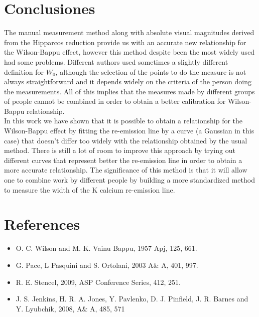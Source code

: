 \documentclass[twocolumn]{AS4201}
\begin{document}
\section{Conclusiones}
The manual measurement method along with absolute visual magnitudes derived from the Hipparcos reduction provide us with an accurate new relationship for the Wilson-Bappu effect, however this method despite been the most widely used had some problems. Different authors used sometimes a slightly different definition for $W_0$, although the selection of the points to do the measure is not always straightforward and it depends widely on the criteria of the person doing the measurements. All of this implies that the measures made by different groups of people cannot be combined in order to obtain a better calibration for Wilson-Bappu relationship.\\
In this work we have shown that it is possible to obtain a relationship for the Wilson-Bappu effect by fitting the re-emission line by a curve (a Gaussian in this case) that doesn't differ too widely with the relationship obtained by the usual method. There is still a lot of room to improve this approach by trying out different curves that represent better the re-emission line in order to obtain a more accurate relationship. The significance of this method is that it will allow one to combine work by different people by building a more standardized method to measure the width of the K calcium re-emission line.
\\
\section*{References}
\begin{itemize}
\item[] O. C. Wilson and M. K. Vainu Bappu, 1957 Apj, 125, 661.
\item[] G. Pace, L Pasquini and S. Ortolani, 2003 A\& A, 401, 997.
\item[] R. E.  Stencel, 2009, ASP Conference Series, 412, 251.
\item[] J. S. Jenkins, H. R. A. Jones, Y. Pavlenko, D. J. Pinfield, J. R. Barnes and Y. Lyubchik, 2008, A\& A, 485, 571
\end{itemize}
\end{document}
